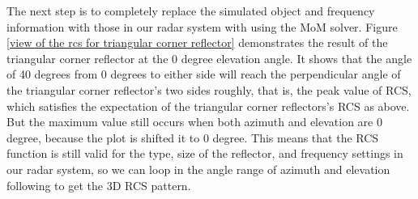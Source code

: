 \documentclass[12pt,DIV14,BCOR12mm,a4paper,footinclude=false,headinclude,parskip=half-,twoside,openright,cleardoublepage=empty,toc=index,bibliography=totoc,listof=totoc]{scrreprt}
\numberwithin{equation}{chapter}
\begin{document}
The next step is to completely replace the simulated object and frequency information with those in our radar system with using the MoM solver. Figure \ref{view of the rcs for triangular corner reflector} demonstrates the result of the triangular corner reflector at the 0 degree elevation angle. It shows that the angle of 40 degrees from 0 degrees to either side will reach the perpendicular angle of the triangular corner reflector's two sides roughly, that is, the peak value of RCS, which satisfies the expectation of the triangular corner reflectors's RCS as above. But the maximum value still occurs when both azimuth and elevation are 0 degree, because the plot is shifted it to 0 degree. This means that the RCS function is still valid for the type, size of the reflector, and frequency settings in our radar system, so we can loop in the angle range of azimuth and elevation following to get the 3D RCS pattern.
\end{document}
